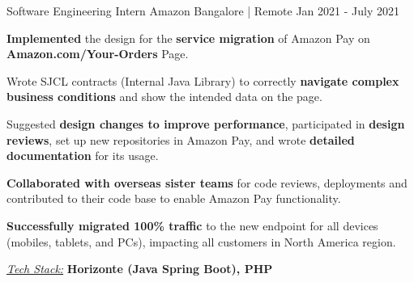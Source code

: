 \documentclass[11pt, a4paper]{awesome-cv} %
\begin{document}
\begin{cventries}
  \cventry
    {Software Engineering Intern} %
    {Amazon} %
    {Bangalore | Remote} %
    {Jan 2021 - July 2021} %
    {
      \begin{cvitems} %
        \item {\textbf{Implemented} the design for the \textbf{service migration} of Amazon Pay on \textbf{Amazon.com/Your-Orders} Page.}
        \item {Wrote SJCL contracts (Internal Java Library) to correctly \textbf{navigate complex business conditions} and show the intended data on the page.}
        \item {Suggested \textbf{design changes to improve performance}, participated in \textbf{design reviews}, set up new repositories in Amazon Pay, and wrote \textbf{detailed documentation} for its usage.}
        \item {\textbf{Collaborated with overseas sister teams} for code reviews, deployments and contributed to their code base to enable Amazon Pay functionality.}
        \item {\textbf{Successfully migrated 100\% traffic} to the new endpoint for all devices (mobiles, tablets, and PCs), impacting all customers in North America region.}
        \item {\textit{\href{}{\color{awesome-red} Tech Stack:}} \textbf{Horizonte (Java Spring Boot), PHP}}
      \end{cvitems}
    }

\end{cventries}




\end{document}

